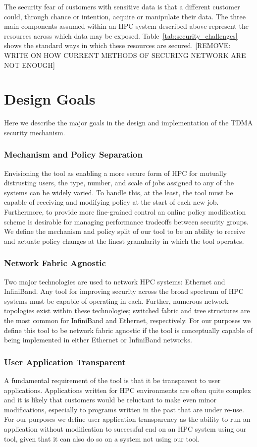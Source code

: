 \documentclass[oneside,12pt]{memoir}
\begin{document}
The security fear of customers with sensitive data is that a different customer could, through chance or intention, acquire or manipulate their data. The three main components assumed within an HPC system described above represent the resources across which data may be exposed. Table~\ref{tab:security_challenges} shows the standard ways in which these resources are secured. [REMOVE: WRITE ON HOW CURRENT METHODS OF SECURING NETWORK ARE NOT ENOUGH]
\chapter{Design Goals}
Here we describe the major goals in the design and implementation of the TDMA security mechanism.
\subsection{Mechanism and Policy Separation}
Envisioning the tool as enabling a more secure form of HPC for mutually distrusting users, the type, number, and scale of jobs assigned to any of the systems can be widely varied. To handle this, at the least, the tool must be capable of receiving and modifying policy at the start of each new job. Furthermore, to provide more fine-grained control an online policy modification scheme is desirable for managing performance tradeoffs between security groups. We define the mechanism and policy split of our tool to be an ability to receive and actuate policy changes at the finest granularity in which the tool operates.
\subsection{Network Fabric Agnostic}
Two major technologies are used to network HPC systems: Ethernet and InfiniBand. Any tool for improving security across the broad spectrum of HPC systems must be capable of operating in each. Further, numerous network topologies exist within these technologies; switched fabric and tree structures are the most common for InfiniBand and Ethernet, respectively. For our purposes we define this tool to be network fabric agnostic if the tool is conceptually capable of being implemented in either Ethernet or InfiniBand networks. 
\subsection{User Application Transparent}
A fundamental requirement of the tool is that it be transparent to user applications. Applications written for HPC environments are often quite complex and it is likely that customers would be reluctant to make even minor modifications, especially to programs written in the past that are under re-use. For our purposes we define user application transparency as the ability to run an application without modification to successful end on an HPC system using our tool, given that it can also do so on a system not using our tool. 
\end{document}

